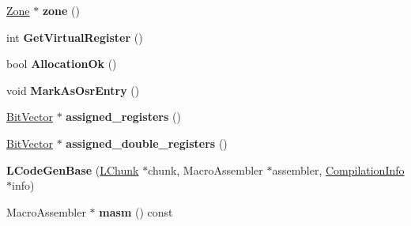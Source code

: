 \begin{DoxyCompactItemize}
\item 
\hypertarget{classv8_1_1internal_1_1_b_a_s_e___e_m_b_e_d_d_e_d_a24414c9eceec7debdc37dfbbf7265db0}{}\hyperlink{classv8_1_1internal_1_1_zone}{Zone} $\ast$ {\bfseries zone} ()\label{classv8_1_1internal_1_1_b_a_s_e___e_m_b_e_d_d_e_d_a24414c9eceec7debdc37dfbbf7265db0}

\item 
\hypertarget{classv8_1_1internal_1_1_b_a_s_e___e_m_b_e_d_d_e_d_a4496f816450e1aacab09a369fab537c7}{}int {\bfseries Get\+Virtual\+Register} ()\label{classv8_1_1internal_1_1_b_a_s_e___e_m_b_e_d_d_e_d_a4496f816450e1aacab09a369fab537c7}

\item 
\hypertarget{classv8_1_1internal_1_1_b_a_s_e___e_m_b_e_d_d_e_d_a35843d8df9c2b7e2a6f5185a6b62f657}{}bool {\bfseries Allocation\+Ok} ()\label{classv8_1_1internal_1_1_b_a_s_e___e_m_b_e_d_d_e_d_a35843d8df9c2b7e2a6f5185a6b62f657}

\item 
\hypertarget{classv8_1_1internal_1_1_b_a_s_e___e_m_b_e_d_d_e_d_ab159039531b0a6c920af1ef8600a81e0}{}void {\bfseries Mark\+As\+Osr\+Entry} ()\label{classv8_1_1internal_1_1_b_a_s_e___e_m_b_e_d_d_e_d_ab159039531b0a6c920af1ef8600a81e0}

\item 
\hypertarget{classv8_1_1internal_1_1_b_a_s_e___e_m_b_e_d_d_e_d_a5c90b98d26a0530ae4c2bf238f7ac5f4}{}\hyperlink{classv8_1_1internal_1_1_bit_vector}{Bit\+Vector} $\ast$ {\bfseries assigned\+\_\+registers} ()\label{classv8_1_1internal_1_1_b_a_s_e___e_m_b_e_d_d_e_d_a5c90b98d26a0530ae4c2bf238f7ac5f4}

\item 
\hypertarget{classv8_1_1internal_1_1_b_a_s_e___e_m_b_e_d_d_e_d_aee6adf90cd993224601b4c38bcad3983}{}\hyperlink{classv8_1_1internal_1_1_bit_vector}{Bit\+Vector} $\ast$ {\bfseries assigned\+\_\+double\+\_\+registers} ()\label{classv8_1_1internal_1_1_b_a_s_e___e_m_b_e_d_d_e_d_aee6adf90cd993224601b4c38bcad3983}

\item 
\hypertarget{classv8_1_1internal_1_1_b_a_s_e___e_m_b_e_d_d_e_d_a7f80fd731306f5f725e860aa158088b9}{}{\bfseries L\+Code\+Gen\+Base} (\hyperlink{classv8_1_1internal_1_1_l_chunk}{L\+Chunk} $\ast$chunk, Macro\+Assembler $\ast$assembler, \hyperlink{classv8_1_1internal_1_1_compilation_info}{Compilation\+Info} $\ast$info)\label{classv8_1_1internal_1_1_b_a_s_e___e_m_b_e_d_d_e_d_a7f80fd731306f5f725e860aa158088b9}

\item 
\hypertarget{classv8_1_1internal_1_1_b_a_s_e___e_m_b_e_d_d_e_d_aaf336e08bf77333a99e2d9239c76af98}{}Macro\+Assembler $\ast$ {\bfseries masm} () const \label{classv8_1_1internal_1_1_b_a_s_e___e_m_b_e_d_d_e_d_aaf336e08bf77333a99e2d9239c76af98}


\end{DoxyCompactItemize}
